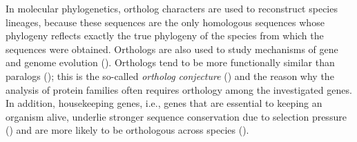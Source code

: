 In molecular phylogenetics, ortholog characters are used to reconstruct species
lineages, because these sequences are the only homologous sequences whose
phylogeny reflects exactly the true phylogeny of the species from which the
sequences were obtained. Orthologs are also used to study mechanisms of gene and
genome evolution (\cite{dessimoz2012}). Orthologs tend to be more functionally
similar than paralogs (\cite{altenhoff2012}); this is the so-called
\emph{ortholog conjecture} (\cite{tatusov1997}) and the reason why the analysis
of protein families often requires orthology among the investigated genes. In
addition, housekeeping genes, i.e., genes that are essential to keeping an
organism alive, underlie stronger sequence conservation due to selection
pressure (\cite{she2009}) and are more likely to be orthologous across species
(\cite{waterhouse2011}). 
